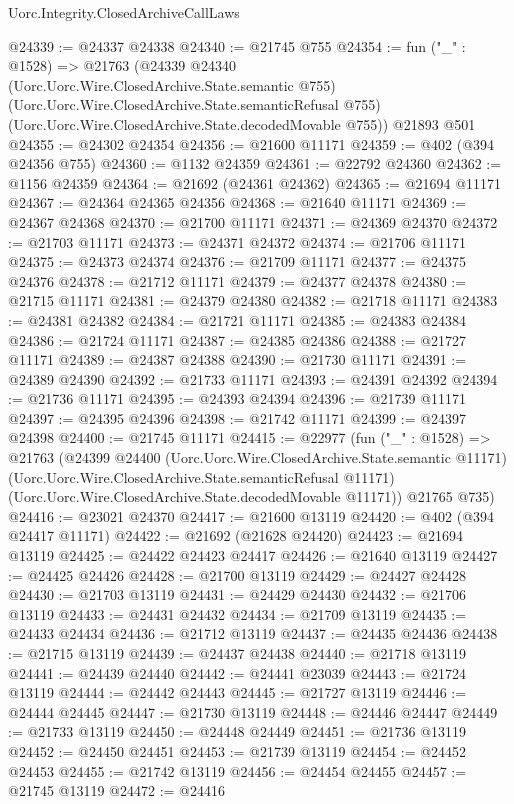 \begin{lexlean}{Uorc.Integrity.ClosedArchiveCallLaws}
\begin{coremodule}
@24339 := @24337 @24338
@24340 := @21745 @755
@24354 := fun ("_" : @1528) =>
  @21763
    (@24339
      @24340
      (Uorc.Uorc.Wire.ClosedArchive.State.semantic @755)
      (Uorc.Uorc.Wire.ClosedArchive.State.semanticRefusal @755)
      (Uorc.Uorc.Wire.ClosedArchive.State.decodedMovable @755))
    @21893
    @501
@24355 := @24302 @24354
@24356 := @21600 @11171
@24359 := @402 (@394 @24356 @755)
@24360 := @1132 @24359
@24361 := @22792 @24360
@24362 := @1156 @24359
@24364 := @21692 (@24361 @24362)
@24365 := @21694 @11171
@24367 := @24364 @24365 @24356
@24368 := @21640 @11171
@24369 := @24367 @24368
@24370 := @21700 @11171
@24371 := @24369 @24370
@24372 := @21703 @11171
@24373 := @24371 @24372
@24374 := @21706 @11171
@24375 := @24373 @24374
@24376 := @21709 @11171
@24377 := @24375 @24376
@24378 := @21712 @11171
@24379 := @24377 @24378
@24380 := @21715 @11171
@24381 := @24379 @24380
@24382 := @21718 @11171
@24383 := @24381 @24382
@24384 := @21721 @11171
@24385 := @24383 @24384
@24386 := @21724 @11171
@24387 := @24385 @24386
@24388 := @21727 @11171
@24389 := @24387 @24388
@24390 := @21730 @11171
@24391 := @24389 @24390
@24392 := @21733 @11171
@24393 := @24391 @24392
@24394 := @21736 @11171
@24395 := @24393 @24394
@24396 := @21739 @11171
@24397 := @24395 @24396
@24398 := @21742 @11171
@24399 := @24397 @24398
@24400 := @21745 @11171
@24415 := @22977
    (fun ("_" : @1528) =>
    @21763
      (@24399
        @24400
        (Uorc.Uorc.Wire.ClosedArchive.State.semantic @11171)
        (Uorc.Uorc.Wire.ClosedArchive.State.semanticRefusal @11171)
        (Uorc.Uorc.Wire.ClosedArchive.State.decodedMovable @11171))
      @21765
      @735)
@24416 := @23021 @24370
@24417 := @21600 @13119
@24420 := @402 (@394 @24417 @11171)
@24422 := @21692 (@21628 @24420)
@24423 := @21694 @13119
@24425 := @24422 @24423 @24417
@24426 := @21640 @13119
@24427 := @24425 @24426
@24428 := @21700 @13119
@24429 := @24427 @24428
@24430 := @21703 @13119
@24431 := @24429 @24430
@24432 := @21706 @13119
@24433 := @24431 @24432
@24434 := @21709 @13119
@24435 := @24433 @24434
@24436 := @21712 @13119
@24437 := @24435 @24436
@24438 := @21715 @13119
@24439 := @24437 @24438
@24440 := @21718 @13119
@24441 := @24439 @24440
@24442 := @24441 @23039
@24443 := @21724 @13119
@24444 := @24442 @24443
@24445 := @21727 @13119
@24446 := @24444 @24445
@24447 := @21730 @13119
@24448 := @24446 @24447
@24449 := @21733 @13119
@24450 := @24448 @24449
@24451 := @21736 @13119
@24452 := @24450 @24451
@24453 := @21739 @13119
@24454 := @24452 @24453
@24455 := @21742 @13119
@24456 := @24454 @24455
@24457 := @21745 @13119
@24472 := @24416

\end{coremodule}
\end{lexlean}
